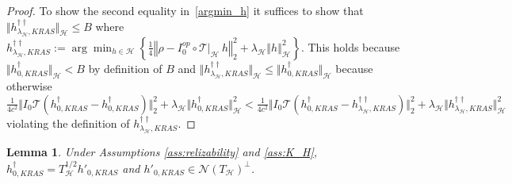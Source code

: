 \documentclass[twoside,11pt]{article}
\newtheorem{lemma}{Lemma}
\newcommand{\mc}{\mathcal}
\begin{document}
\begin{proof}
    To show the second equality in~\eqref{argmin_h} it suffices to show that $\Vert h^{\dag\dag}_{\lambda_\mc{H},KRAS}\Vert_\mc{H}\le B$ where $h^{\dag\dag}_{\lambda_\mc{H},KRAS}:=\arg\min_{h\in\mc{H}}\left\{\frac{1}{4}\left\Vert\rho- I_0^{op} \circ \mc{T}\vert_\mc{H} \:h\right\Vert_2^2+\lambda_{\mc{H}}\left\Vert h\right\Vert_{\mc{H}}^2\right\}$. This holds because $\Vert h^{\dag}_{0,KRAS}\Vert_\mc{H}<B$ by definition of $B$ and $\Vert h^{\dag\dag}_{\lambda_\mc{H},KRAS}\Vert_\mc{H}\le \Vert h^{\dag}_{0,KRAS}\Vert_\mc{H}$ because otherwise $ \frac{1}{4c^2}\Vert I_0\mc{T}(h_{0,KRAS}^\dag-h_{0,KRAS}^\dag)\Vert_2^2+\lambda_{\mc{H}}\big\Vert h_{0,KRAS}^\dag\big\Vert_{\mc{H}}^2<\frac{1}{4c^2}\Vert I_0\mc{T}(h_{0,KRAS}^\dag-h_{\lambda_\mc{H},KRAS}^{\dag\dag})\Vert_2^2+\lambda_{\mc{H}}\big\Vert h_{\lambda_\mc{H},KRAS}^{\dag\dag}\big\Vert_{\mc{H}}^2$ violating the definition of $h_{\lambda_\mc{H},KRAS}^{\dag\dag}$.
\end{proof}

\begin{lemma}
        Under Assumptions \ref{ass:relizability} and \ref{ass:K_H}, $h_{0,KRAS}^\dag=T_{\mc{H}}^{1/2}h'_{0,KRAS}$ and $h'_{0,KRAS}\in\mc{N}(T_\mc{H})^\perp$.\label{lemma:min_rkhs_norm_sol_h}
    \end{lemma}
\end{document}
